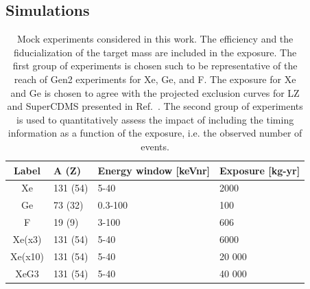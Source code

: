 \documentclass[11pt]{article}
\begin{document}
\subsection{Simulations\label{sec:sims}}

\begin{table}[tbp]
  \setlength{\extrarowheight}{3pt}
  \setlength{\tabcolsep}{10pt}
  \begin{center}
	\begin{tabular}{c|m{2.3cm}m{4.2cm}m{2.8cm}}  
	Label & A (Z) & Energy window [keVnr] & Exposure [kg-yr] \\
	\hline
	Xe & 131 (54) & 5-40 & 2000 \\
	Ge & 73 (32) & 0.3-100 & 100  \\
	F &  19 (9) & 3-100 & 606 \\
	\hline
	Xe(x3) & 131 (54) & 5-40 & 6000 \\
	Xe(x10) & 131 (54) & 5-40 & 20 000 \\
	XeG3 & 131 (54) & 5-40 & 40 000 \\
	\end{tabular}
  \end{center}
\caption{Mock experiments considered in this work. The efficiency and the fiducialization of the target mass are included in the exposure. The first group of experiments is chosen such to be representative of the reach of Gen2 experiments for Xe, Ge, and F. The exposure for Xe and Ge is chosen to agree with the projected exclusion curves for LZ and SuperCDMS presented in Ref.~\cite{Cushman:2013zza}. The second group of experiments is used to quantitatively assess the impact of including the timing information as a function of the exposure, i.e. the observed number of events. }
\label{tab:experiments}
\end{table}
\end{document}

